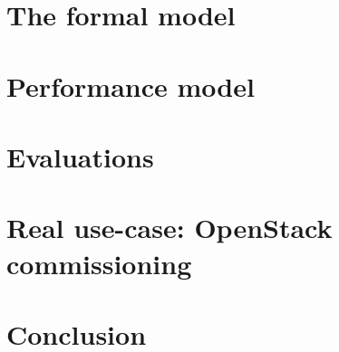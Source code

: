 \documentclass[5p]{elsarticle}
\begin{document}
\section{The \mad formal model}
\label{sec:formal_model}


\section{Performance model}
\label{sec:perf_model}


\section{Evaluations}
\label{sec:evaluations}


\section{Real use-case: OpenStack commissioning}
\label{sec:use-cases}


\section{Conclusion}
\label{sec:conc}






%  

\end{document}
